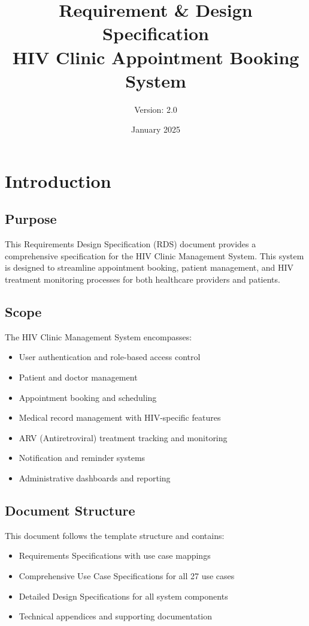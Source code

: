 \documentclass[12pt,a4paper]{article}
\title{\textbf{Requirement \& Design Specification\\HIV Clinic Appointment Booking System}}
\author{Version: 2.0}
\date{January 2025}
\begin{document}
\maketitle

\newpage

\tableofcontents

\newpage

\section{Introduction}

\subsection{Purpose}
This Requirements Design Specification (RDS) document provides a comprehensive specification for the HIV Clinic Management System. This system is designed to streamline appointment booking, patient management, and HIV treatment monitoring processes for both healthcare providers and patients.

\subsection{Scope}
The HIV Clinic Management System encompasses:
\begin{itemize}
    \item User authentication and role-based access control
    \item Patient and doctor management
    \item Appointment booking and scheduling
    \item Medical record management with HIV-specific features
    \item ARV (Antiretroviral) treatment tracking and monitoring
    \item Notification and reminder systems
    \item Administrative dashboards and reporting
\end{itemize}

\subsection{Document Structure}
This document follows the template structure and contains:
\begin{itemize}
    \item Requirements Specifications with use case mappings
    \item Comprehensive Use Case Specifications for all 27 use cases
    \item Detailed Design Specifications for all system components
    \item Technical appendices and supporting documentation
\end{itemize}
\end{document}
